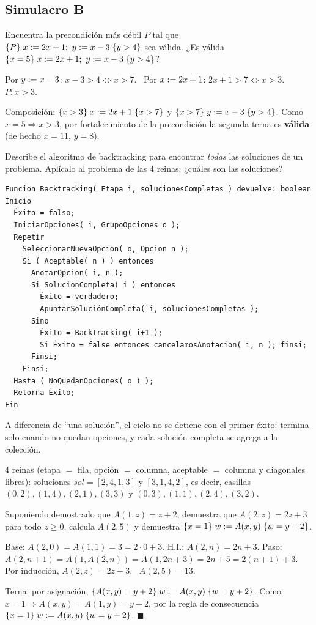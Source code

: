 \newpage
\subsection*{Simulacro B}

\begin{prob}[ · B1]
Encuentra la precondición más débil $P$ tal que $\{P\}\;x\mathrel{:=} 2x+1;\ y\mathrel{:=} x-3\;\{y>4\}$ sea válida. ¿Es válida $\{x=5\}\;x\mathrel{:=} 2x+1;\ y\mathrel{:=} x-3\;\{y>4\}$?
\end{prob}
\begin{sol}
Por $y\mathrel{:=} x-3$: $x-3>4\iff x>7$. \ Por $x\mathrel{:=}2x+1$: $2x+1>7\iff x>3$. \quad $P: x>3$.

Composición: $\{x>3\}\;x\mathrel{:=}2x+1\;\{x>7\}$ y $\{x>7\}\;y\mathrel{:=} x-3\;\{y>4\}$. Como $x=5\Rightarrow x>3$, por fortalecimiento de la precondición la segunda terna es \textbf{válida} (de hecho $x=11$, $y=8$).
\end{sol}

\begin{prob}[ · B2]
Describe el algoritmo de backtracking para encontrar \emph{todas} las soluciones de un problema. Aplícalo al problema de las 4 reinas: ¿cuáles son las soluciones?
\end{prob}
\begin{sol}
\begin{lstlisting}
Funcion Backtracking( Etapa i, solucionesCompletas ) devuelve: boolean
Inicio
  Éxito = falso;
  IniciarOpciones( i, GrupoOpciones o );
  Repetir
    SeleccionarNuevaOpcion( o, Opcion n );
    Si ( Aceptable( n ) ) entonces
      AnotarOpcion( i, n );
      Si SolucionCompleta( i ) entonces
        Éxito = verdadero;
        ApuntarSoluciónCompleta( i, solucionesCompletas );
      Sino
        Éxito = Backtracking( i+1 );
        Si Éxito = false entonces cancelamosAnotacion( i, n ); finsi;
      Finsi;
    Finsi;
  Hasta ( NoQuedanOpciones( o ) );
  Retorna Éxito;
Fin
\end{lstlisting}
A diferencia de ``una solución'', el ciclo no se detiene con el primer éxito: termina solo cuando no quedan opciones, y cada solución completa se agrega a la colección.

4 reinas (etapa $=$ fila, opción $=$ columna, aceptable $=$ columna y diagonales libres): soluciones $\mathit{sol}=[2,4,1,3]$ y $[3,1,4,2]$, es decir, casillas $(0,2),(1,4),(2,1),(3,3)$ y $(0,3),(1,1),(2,4),(3,2)$.
\end{sol}

\begin{prob}[ · B3]
Suponiendo demostrado que $A(1,z)=z+2$, demuestra que $A(2,z)=2z+3$ para todo $z\ge0$, calcula $A(2,5)$ y demuestra $\{x=1\}\;w\mathrel{:=} A(x,y)\;\{w=y+2\}$.
\end{prob}
\begin{sol}
Base: $A(2,0)=A(1,1)=3=2\cdot0+3$. H.I.: $A(2,n)=2n+3$. Paso: $A(2,n+1)=A(1,A(2,n))=A(1,2n+3)=2n+5=2(n+1)+3$. Por inducción, $A(2,z)=2z+3$. \ $A(2,5)=13$.

Terna: por asignación, $\{A(x,y)=y+2\}\;w\mathrel{:=} A(x,y)\;\{w=y+2\}$. Como $x=1\Rightarrow A(x,y)=A(1,y)=y+2$, por la regla de consecuencia $\{x=1\}\;w\mathrel{:=} A(x,y)\;\{w=y+2\}$. $\blacksquare$
\end{sol}

